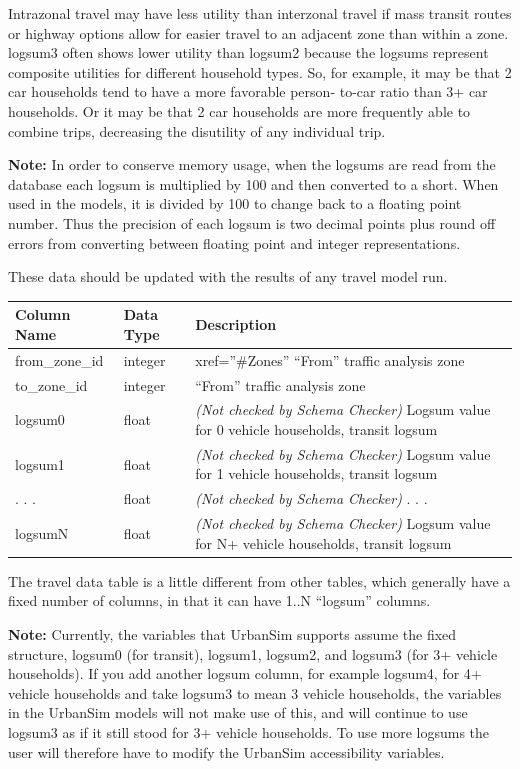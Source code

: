 Intrazonal travel may have less utility than interzonal travel if
mass transit routes or highway options allow for easier travel to an
adjacent zone than within a zone. logsum3 often shows lower utility
than logsum2 because the logsums represent composite utilities for
different household types. So, for example, it may be that 2 car
households tend to have a more favorable person- to-car ratio than
3+ car households. Or it may be that 2 car households are more
frequently able to combine trips, decreasing the disutility of any
individual trip.


\textbf{Note:}
In order to conserve memory usage, when the logsums are read from the database
each logsum is multiplied by 100 and then converted to a short. When used in
the models, it is divided by 100 to change back to a floating point number.
Thus the precision of each logsum is two decimal points plus round off errors
from converting between floating point and integer representations.


These data should be updated with the results of any travel model run.


\begin{tabular}{|l|l|p{4in}|}
\hline
\textbf{Column Name} & \textbf{Data Type} & \textbf{Description} \\
\hline
from_zone_id & integer &  xref=''\#Zones'' ``From'' traffic analysis zone   \\
\hline
to_zone_id & integer &  ``From'' traffic analysis zone   \\
\hline
logsum0 & float & \emph{(Not checked by Schema Checker) }
Logsum value for 0 vehicle households, transit logsum  \\
\hline
logsum1 & float & \emph{(Not checked by Schema Checker) }
Logsum value for 1 vehicle households, transit logsum  \\
\hline
. . . & float & \emph{(Not checked by Schema Checker) }
. . .  \\
\hline
logsumN & float & \emph{(Not checked by Schema Checker) }
Logsum value for N+ vehicle households, transit logsum  \\
\hline

\end{tabular}



The travel data table is a little different from other tables, which generally
have a fixed number of columns, in that it can have 1..N ``logsum'' columns.

\textbf{Note:} Currently, the variables that UrbanSim supports assume the
fixed structure, logsum0 (for transit), logsum1, logsum2, and logsum3 (for
3+ vehicle households). If you add another logsum column, for example
logsum4, for 4+ vehicle households and take logsum3 to mean 3 vehicle
households, the variables in the UrbanSim models will not make
use of this, and will continue to use logsum3 as if it still stood for 3+
vehicle households. To use more logsums the user will therefore have to
modify the UrbanSim accessibility variables.

